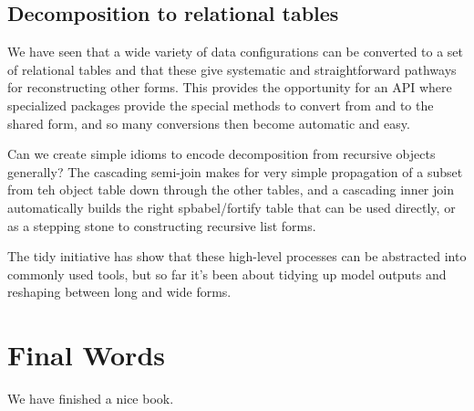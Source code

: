 \documentclass[]{book}
\begin{document}
\section{Decomposition to relational
tables}\label{decomposition-to-relational-tables}

We have seen that a wide variety of data configurations can be converted
to a set of relational tables and that these give systematic and
straightforward pathways for reconstructing other forms. This provides
the opportunity for an API where specialized packages provide the
special methods to convert from and to the shared form, and so many
conversions then become automatic and easy.

Can we create simple idioms to encode decomposition from recursive
objects generally? The cascading semi-join makes for very simple
propagation of a subset from teh object table down through the other
tables, and a cascading inner join automatically builds the right
spbabel/fortify table that can be used directly, or as a stepping stone
to constructing recursive list forms.

The tidy initiative has show that these high-level processes can be
abstracted into commonly used tools, but so far it's been about tidying
up model outputs and reshaping between long and wide forms.

\chapter{Final Words}\label{final-words}

We have finished a nice book.


\end{document}
